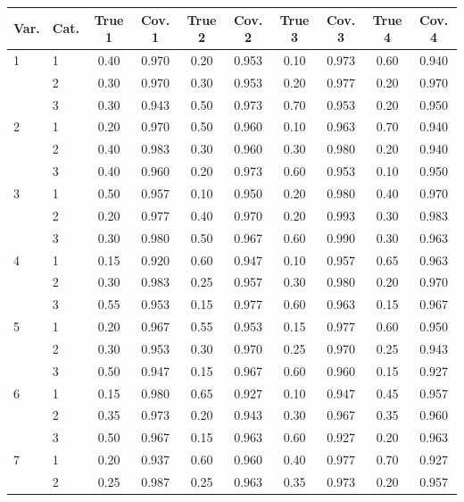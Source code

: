 \begin{longtable}{llcccccccc}
  \toprule
\textbf{Var.} & \textbf{Cat.} & \textbf{True 1} & \textbf{Cov. 1} & \textbf{True 2} & \textbf{Cov. 2} & \textbf{True 3} & \textbf{Cov. 3} & \textbf{True 4} & \textbf{Cov. 4} \\ 
  \midrule
1 & 1 & 0.40 & 0.970 & 0.20 & 0.953 & 0.10 & 0.973 & 0.60 & 0.940 \\ 
   & 2 & 0.30 & 0.970 & 0.30 & 0.953 & 0.20 & 0.977 & 0.20 & 0.970 \\ 
   & 3 & 0.30 & 0.943 & 0.50 & 0.973 & 0.70 & 0.953 & 0.20 & 0.950 \\ 
  2 & 1 & 0.20 & 0.970 & 0.50 & 0.960 & 0.10 & 0.963 & 0.70 & 0.940 \\ 
   & 2 & 0.40 & 0.983 & 0.30 & 0.960 & 0.30 & 0.980 & 0.20 & 0.940 \\ 
   & 3 & 0.40 & 0.960 & 0.20 & 0.973 & 0.60 & 0.953 & 0.10 & 0.950 \\ 
  3 & 1 & 0.50 & 0.957 & 0.10 & 0.950 & 0.20 & 0.980 & 0.40 & 0.970 \\ 
   & 2 & 0.20 & 0.977 & 0.40 & 0.970 & 0.20 & 0.993 & 0.30 & 0.983 \\ 
   & 3 & 0.30 & 0.980 & 0.50 & 0.967 & 0.60 & 0.990 & 0.30 & 0.963 \\ 
  4 & 1 & 0.15 & 0.920 & 0.60 & 0.947 & 0.10 & 0.957 & 0.65 & 0.963 \\ 
   & 2 & 0.30 & 0.983 & 0.25 & 0.957 & 0.30 & 0.980 & 0.20 & 0.970 \\ 
   & 3 & 0.55 & 0.953 & 0.15 & 0.977 & 0.60 & 0.963 & 0.15 & 0.967 \\ 
  5 & 1 & 0.20 & 0.967 & 0.55 & 0.953 & 0.15 & 0.977 & 0.60 & 0.950 \\ 
   & 2 & 0.30 & 0.953 & 0.30 & 0.970 & 0.25 & 0.970 & 0.25 & 0.943 \\ 
   & 3 & 0.50 & 0.947 & 0.15 & 0.967 & 0.60 & 0.960 & 0.15 & 0.927 \\ 
  6 & 1 & 0.15 & 0.980 & 0.65 & 0.927 & 0.10 & 0.947 & 0.45 & 0.957 \\ 
   & 2 & 0.35 & 0.973 & 0.20 & 0.943 & 0.30 & 0.967 & 0.35 & 0.960 \\ 
   & 3 & 0.50 & 0.967 & 0.15 & 0.963 & 0.60 & 0.927 & 0.20 & 0.963 \\ 
  7 & 1 & 0.20 & 0.937 & 0.60 & 0.960 & 0.40 & 0.977 & 0.70 & 0.927 \\ 
   & 2 & 0.25 & 0.987 & 0.25 & 0.963 & 0.35 & 0.973 & 0.20 & 0.957 \\ 

\end{longtable}
